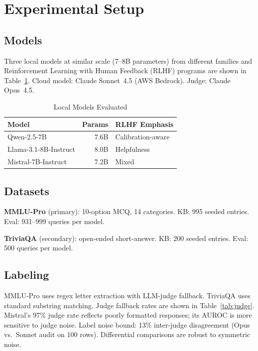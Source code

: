\documentclass[journal]{IEEEtran}
\begin{document}
\section{Experimental Setup}
\label{sec:setup}

\subsection{Models}

Three local models at similar scale (7--8B parameters) from different families and Reinforcement Learning with Human Feedback (RLHF) programs are shown in Table~\ref{tab:models}. Cloud model: Claude Sonnet~4.5 (AWS Bedrock). Judge: Claude Opus~4.5.

\begin{table}[t]
\centering
\caption{Local Models Evaluated}
\label{tab:models}
\begin{tabular}{lrl}
\toprule
Model & Params & RLHF Emphasis \\
\midrule
Qwen-2.5-7B & 7.6B & Calibration-aware \\
Llama-3.1-8B-Instruct & 8.0B & Helpfulness \\
Mistral-7B-Instruct & 7.2B & Mixed \\
\bottomrule
\end{tabular}
\end{table}

\subsection{Datasets}

\textbf{MMLU-Pro} (primary): 10-option MCQ, 14 categories. KB: 995 seeded entries. Eval: 931--999 queries per model.

\textbf{TriviaQA} (secondary): open-ended short-answer. KB: 200 seeded entries. Eval: 500 queries per model.

\subsection{Labeling}

MMLU-Pro uses regex letter extraction with LLM-judge fallback. TriviaQA uses standard substring matching. Judge fallback rates are shown in Table~\ref{tab:judge}. Mistral's 97\% judge rate reflects poorly formatted responses; its AUROC is more sensitive to judge noise. Label noise bound: 13\% inter-judge disagreement (Opus vs.\ Sonnet audit on 100 rows). Differential comparisons are robust to symmetric noise.
\end{document}

